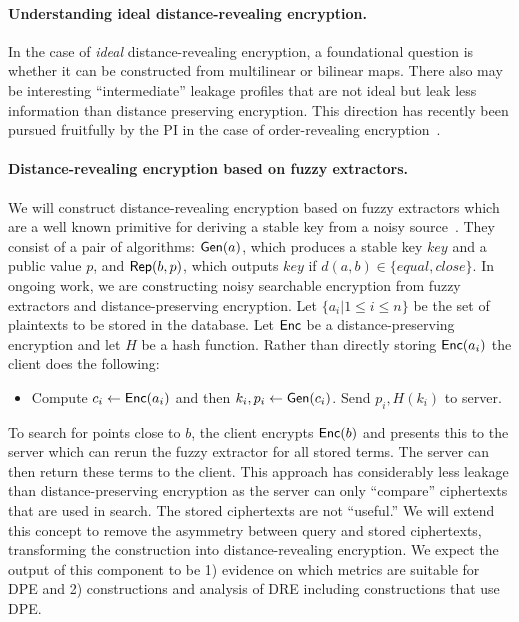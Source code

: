 \paragraph{Understanding ideal distance-revealing encryption.}
In the case of \emph{ideal} distance-revealing encryption, a foundational question is whether it can be constructed from multilinear or bilinear maps.  There also may be interesting ``intermediate'' leakage profiles that are not ideal but leak less information than distance preserving encryption.   This direction has recently been pursued fruitfully by the PI in the case of order-revealing encryption~\cite{EPRINT:CLOZ16}.

\paragraph{Distance-revealing encryption based on fuzzy extractors.}
We will construct distance-revealing encryption based on fuzzy
extractors which are a well known primitive for deriving a stable key
from a noisy source~\cite{EC:DodReySmi04}.  They consist of a pair of
algorithms: $\mathsf{Gen}(a)$, which produces a stable key $key$ and a public
value $p$, and $\mathsf{Rep}(b, p)$, which outputs $key$ if $d(a,b)\in\{equal,close\}$.  In ongoing work, we are constructing noisy searchable encryption from fuzzy extractors and distance-preserving encryption.  Let $\{a_i | 1\le i \le n\}$ be the set of plaintexts to be stored in the database.  Let $\mathsf{Enc}$ be a distance-preserving encryption and let $H$ be a hash function.  Rather than directly storing $\mathsf{Enc}(a_i)$ the client does the following:

\begin{itemize}\setlength\itemsep{0em}
\item Compute $c_i \leftarrow \mathsf{Enc}(a_i)$ and then $k_i, p_i \leftarrow \mathsf{Gen}(c_i)$. Send $p_i, H(k_i)$ to server.
\end{itemize}

To search for points close to $b$, the client encrypts $\mathsf{Enc}(b)$ and presents this to the server which can rerun the fuzzy extractor for all stored terms.  The server can then return these terms to the client.  This approach has considerably less leakage than distance-preserving encryption as the server can only ``compare'' ciphertexts that are used in search.  The stored ciphertexts are not ``useful.''  We will extend this concept to remove the asymmetry between query and stored ciphertexts, transforming the construction into distance-revealing encryption.
We expect the output of this component to be 1) evidence on which metrics are suitable for DPE  and 2) constructions and analysis of DRE including constructions that use DPE.  

